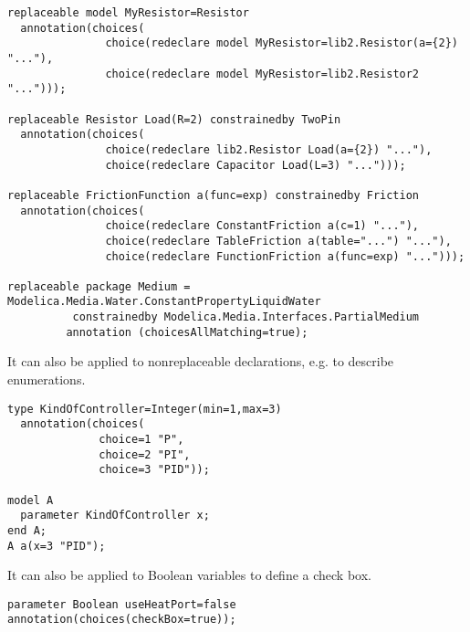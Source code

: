 \begin{example}
\begin{lstlisting}[language=modelica]
replaceable model MyResistor=Resistor
  annotation(choices(
               choice(redeclare model MyResistor=lib2.Resistor(a={2}) "..."),
               choice(redeclare model MyResistor=lib2.Resistor2 "...")));

replaceable Resistor Load(R=2) constrainedby TwoPin
  annotation(choices(
               choice(redeclare lib2.Resistor Load(a={2}) "..."),
               choice(redeclare Capacitor Load(L=3) "...")));

replaceable FrictionFunction a(func=exp) constrainedby Friction
  annotation(choices(
               choice(redeclare ConstantFriction a(c=1) "..."),
               choice(redeclare TableFriction a(table="...") "..."),
               choice(redeclare FunctionFriction a(func=exp) "...")));

replaceable package Medium = Modelica.Media.Water.ConstantPropertyLiquidWater
          constrainedby Modelica.Media.Interfaces.PartialMedium
	     annotation (choicesAllMatching=true);
\end{lstlisting}

It can also be applied to nonreplaceable declarations, e.g. to
describe enumerations.
\begin{lstlisting}[language=modelica]
type KindOfController=Integer(min=1,max=3)
  annotation(choices(
              choice=1 "P",
              choice=2 "PI",
              choice=3 "PID"));

model A
  parameter KindOfController x;
end A;
A a(x=3 "PID");
\end{lstlisting}

It can also be applied to Boolean variables to define a check
box.
\begin{lstlisting}[language=modelica]
parameter Boolean useHeatPort=false annotation(choices(checkBox=true));
\end{lstlisting}

\end{example}
